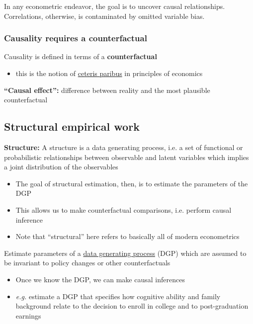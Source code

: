 \documentclass[11pt]{article}
\begin{document}
In any econometric endeavor, the goal is to uncover causal relationships. Correlations, otherwise, is contaminated by omitted variable bias.

\subsubsection{Causality requires a counterfactual}
\label{sec:org0dc1be3}

Causality is defined in terms of a \textbf{counterfactual}

\begin{itemize}
\item this is the notion of \uline{ceteris paribus} in principles of economics
\end{itemize}

\textbf{``Causal effect'':} difference between reality and the most plausible counterfactual

\subsection{Structural empirical work}
\label{sec:org430ac96}

\textbf{Structure:} A structure is a data generating process, i.e. a set of functional or probabilistic relationships between observable and latent variables which implies a joint distribution of the observables

\begin{itemize}
\item The goal of structural estimation, then, is to estimate the parameters of the DGP
\item This allows us to make counterfactual comparisons, i.e. perform causal inference

\item Note that ``structural'' here refers to basically all of modern econometrics
\end{itemize}

Estimate parameters of a \uline{data generating process} (DGP) which are assumed to be invariant to policy changes or other counterfactuals

\begin{itemize}
\item Once we know the DGP, we can make causal inferences
\item \emph{e.g.} estimate a DGP that specifies how cognitive ability and family background relate to the decision to enroll in college and to post-graduation earnings
\end{itemize}
\end{document}
